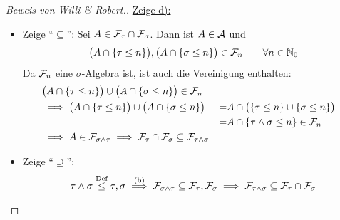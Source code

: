 \documentclass[12pt,a4paper]{article}
\begin{document}
\begin{proof}[Beweis von Willi \& Robert.]
\underline{Zeige d):}\
\begin{itemize}
\item Zeige ``$\subseteq$'':
Sei $A\in\mathcal{F}_\tau\cap\mathcal{F}_\sigma$. Dann ist $A\in\mathcal{A}$ und
\begin{align*}
\big(A\cap\lbrace\tau\leq n\rbrace\big),\big(A\cap\lbrace\sigma\leq n\rbrace\big)\in\mathcal{F}_n\qquad\forall n\in\mathbb{N}_0
\end{align*}
Da $\mathcal{F}_n$ eine $\sigma$-Algebra ist, ist auch die Vereinigung enthalten:
\begin{align*}
&\big(A\cap\lbrace\tau\leq n\rbrace\big)\cup\big(A\cap\lbrace\sigma\leq n\rbrace\big)\in\mathcal{F}_n\\
&\implies
\big(A\cap\lbrace\tau\leq n\rbrace\big)\cup\big(A\cap\lbrace\sigma\leq n\rbrace\big)
&=&A\cap\big(\lbrace\tau\leq n\rbrace\cup\lbrace\sigma\leq n\rbrace\big)\\
&&=&A\cap\lbrace\tau\wedge\sigma\leq n\rbrace\in\mathcal{F}_n\\
&\implies A\in\mathcal{F}_{\sigma\wedge\tau}\implies \mathcal{F}_\tau\cap\mathcal{F}_\sigma\subseteq\mathcal{F}_{\tau\wedge\sigma}
\end{align*}

\item Zeige ``$\supseteq$'':
\begin{align*}
\tau\wedge\sigma\stackrel{\text{Def}}{\leq}\tau,\sigma\stackrel{\text{(b)}}{\implies}\mathcal{F}_{\sigma\wedge\tau}\subseteq\mathcal{F}_\tau,\mathcal{F}_\sigma\implies\mathcal{F}_{\tau\wedge\sigma}\subseteq\mathcal{F}_\tau\cap\mathcal{F}_\sigma
\end{align*}
\end{itemize}
\end{proof}
\end{document}
